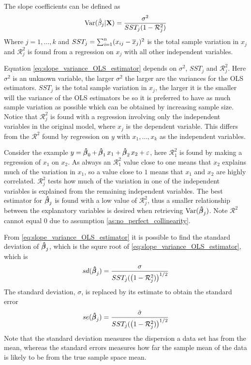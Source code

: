 The slope coefficients can be defined as 
\begin{align}\label{eq:slope_variance_OLS_estimator}
    \operatorname{\text{Var}}(\hat{\beta}_j|\mathbf{X}) = \dfrac{\sigma^2}{SST_j(1- \mathcal{R}_j^2)}
\end{align}
Where $j = 1, \ldots, k$ and $SST_j = \operatorname{\sum_{\textit{i}=1}^n} (x_{ij} - \overline{x}_j)^2$ is the total sample variation in $x_j$ and $\mathcal{R}^2_j$ is found from a regression on $x_j$ with all other independent variables. 

Equation \eqref{eq:slope_variance_OLS_estimator} depends on $\sigma^2$, $SST_j$ and $\mathcal{R}^2_j$.
Here $\sigma^2$ is an unknown variable, the larger $\sigma^2$ the larger are the variances for the OLS estimators. $SST_j$ is the total sample variation in $x_j$, the larger it is the smaller will the variance of the OLS estimators be so it is preferred to have as much sample variation as possible which can be obtained by increasing sample size. 
Notice that $\mathcal{R}^2_j$ is found with a regression involving only the independent variables in the original model, where $x_j$ is the dependent variable. 
This differs from the $\mathcal{R}^2$ found by regression on $y$ with $x_1, \ldots, x_k$ as the independent variables. 

Consider the example $y = \operatorname{\boldsymbol{\hat{\beta}}}_0 + \operatorname{\boldsymbol{\hat{\beta}}}_1 x_1 + \operatorname{\boldsymbol{\hat{\beta}}}_2 x_2 + \varepsilon$, here $\mathcal{R}^2_1$ is found by making a regression of $x_1$ on $x_2$. 
As always an $\mathcal{R}^2_1$ value close to one means that $x_2$ explains much of the variation in $x_1$, so a value close to $1$ means that $x_1$ and $x_2$ are highly correlated.
$\mathcal{R}^2_j$ tests how much of the variation in one of the independent variables is explained from the remaining independent variables.
The best estimator for $\operatorname{\boldsymbol{\hat{\beta}}}_j$ is found with a low value of $\mathcal{R}^2_j$, thus a smaller relationship between the explanatory variables is desired when retrieving $\operatorname{\text{Var}}(\operatorname{\boldsymbol{\hat{\beta}}}_j)$. Note $\mathcal{R}^2$ cannot equal $0$ due to assumption \ref{as:no_perfect_collinearity}. 

From \eqref{eq:slope_variance_OLS_estimator} it is possible to find the standard deviation of $\operatorname{\boldsymbol{\hat{\beta}}}_j$, which is the squre root of \ref{eq:slope_variance_OLS_estimator}, which is
\begin{align}\label{eq:standard_deviation}
    sd(\operatorname{\boldsymbol{\hat{\beta}}}_j) = \dfrac{\sigma}{SST_j(\big(1- \mathcal{R}_j^2)\big)^{1/2}}
\end{align}
The standard deviation, $\sigma$, is replaced by its estimate to obtain the standard error
\begin{align}\label{eq:standad_error}
    se(\operatorname{\boldsymbol{\hat{\beta}}}_j) = \dfrac{\hat{\sigma}}{SST_j(\big(1- \mathcal{R}_j^2)\big)^{1/2}}
\end{align}
Note that the standard deviation measures the dispersion a data set has from the mean, whereas the standard errors measures how far the sample mean of the data is likely to be from the true sample space mean. 

